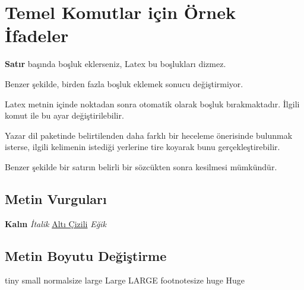 \documentclass[a4paper, 12pt]{article}
\begin{document}
	\section{Temel Komutlar için Örnek İfadeler}
            \textbf{Satır} başında boşluk eklerseniz, Latex bu boşlukları dizmez.
           
Benzer şekilde,            birden fazla boşluk eklemek sonucu değiştirmiyor.

\nonfrenchspacing Latex metnin içinde noktadan sonra otomatik olarak boşluk bırakmaktadır. İlgili komut ile bu ayar değiştirilebilir.

\frenchspacing Yazar dil paketinde belirtilenden daha farklı bir heceleme önerisinde bul\-unm\-ak isterse, ilgili kelimenin istediği yerlerine tire koyarak bunu gerçekleştirebilir.

\doublespacing Benzer şekilde bir satırın \newline belirli bir sözcükten sonra kesilmesi mümkündür.

\subsection{Metin Vurguları}
\textbf{Kalın} \newline
\textit{İtalik} \newline
\underline{Altı Çizili} \newline
\textsl{Eğik} \newline

\subsection{Metin Boyutu Değiştirme}
\tiny tiny \small small \normalsize normalsize \large large \Large Large \LARGE LARGE \footnotesize footnotesize \huge huge \Huge Huge \normalsize
\end{document}
